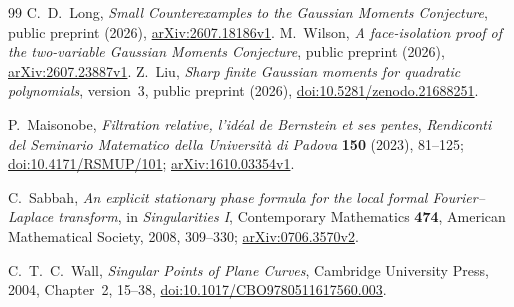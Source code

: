 \documentclass[11pt]{article}
\theoremstyle{definition}\newtheorem{definition}[theorem]{Definition}
\theoremstyle{remark}\newtheorem{remark}[theorem]{Remark}
\begin{document}
\begin{thebibliography}{99}
C.~D.~Long, \emph{Small Counterexamples to the Gaussian Moments Conjecture},
public preprint (2026),
\href{https://arxiv.org/abs/2607.18186v1}{arXiv:2607.18186v1}.
M.~Wilson, \emph{A face-isolation proof of the two-variable Gaussian
Moments Conjecture}, public preprint (2026),
\href{https://arxiv.org/abs/2607.23887v1}{arXiv:2607.23887v1}.
Z.~Liu, \emph{Sharp finite Gaussian moments for quadratic polynomials},
version~3, public preprint (2026),
\href{https://doi.org/10.5281/zenodo.21688251}{doi:10.5281/zenodo.21688251}.

P.~Maisonobe, \emph{Filtration relative, l'id\'eal de Bernstein et ses
pentes}, \emph{Rendiconti del Seminario Matematico della Universit\`a
di Padova} \textbf{150} (2023), 81--125;
\href{https://doi.org/10.4171/RSMUP/101}{doi:10.4171/RSMUP/101};
\href{https://arxiv.org/abs/1610.03354v1}{arXiv:1610.03354v1}.

C.~Sabbah, \emph{An explicit stationary phase formula for the local
formal Fourier--Laplace transform}, in \emph{Singularities I},
Contemporary Mathematics \textbf{474}, American Mathematical Society,
2008, 309--330;
\href{https://arxiv.org/abs/0706.3570v2}{arXiv:0706.3570v2}.

C.~T.~C.~Wall, \emph{Singular Points of Plane Curves}, Cambridge
University Press, 2004, Chapter~2, 15--38,
\href{https://doi.org/10.1017/CBO9780511617560.003}{doi:10.1017/CBO9780511617560.003}.

\end{thebibliography}
\end{document}

